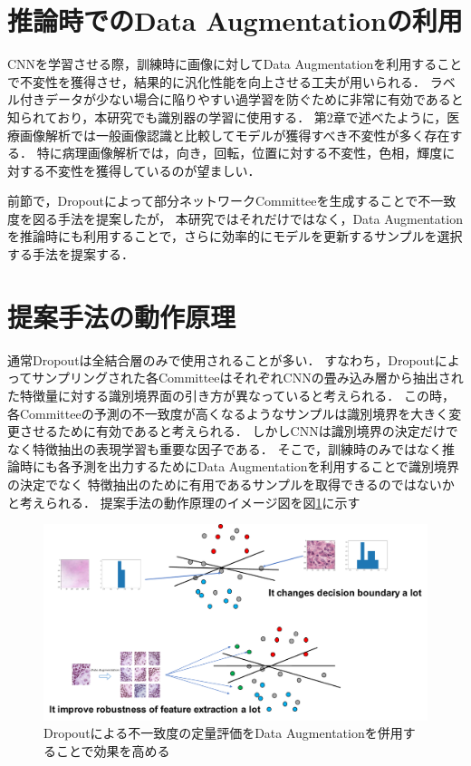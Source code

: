 \section{推論時でのData Augmentationの利用}
CNNを学習させる際，訓練時に画像に対してData Augmentationを利用することで不変性を獲得させ，結果的に汎化性能を向上させる工夫が用いられる．
ラベル付きデータが少ない場合に陥りやすい過学習を防ぐために非常に有効であると知られており，本研究でも識別器の学習に使用する．
第2章で述べたように，医療画像解析では一般画像認識と比較してモデルが獲得すべき不変性が多く存在する．
特に病理画像解析では，向き，回転，位置に対する不変性，色相，輝度に対する不変性を獲得しているのが望ましい．

前節で，Dropoutによって部分ネットワークCommitteeを生成することで不一致度を図る手法を提案したが，
本研究ではそれだけではなく，Data Augmentationを推論時にも利用することで，さらに効率的にモデルを更新するサンプルを選択する手法を提案する．

\section{提案手法の動作原理}
通常Dropoutは全結合層のみで使用されることが多い．
すなわち，Dropoutによってサンプリングされた各CommitteeはそれぞれCNNの畳み込み層から抽出された特徴量に対する識別境界面の引き方が異なっていると考えられる．
この時，各Committeeの予測の不一致度が高くなるようなサンプルは識別境界を大きく変更させるために有効であると考えられる．
しかしCNNは識別境界の決定だけでなく特徴抽出の表現学習も重要な因子である．
そこで，訓練時のみではなく推論時にも各予測を出力するためにData Augmentationを利用することで識別境界の決定でなく
特徴抽出のために有用であるサンプルを取得できるのではないかと考えられる．
提案手法の動作原理のイメージ図を図\ref{fig:how_it_works}に示す


\begin{figure}[tbp]
     \begin{center}
      \includegraphics[width=120mm]{figures/how_it_works.pdf}
     \end{center}
    \caption{\label{fig:how_it_works}Dropoutによる不一致度の定量評価をData Augmentationを併用することで効果を高める}
\end{figure}



